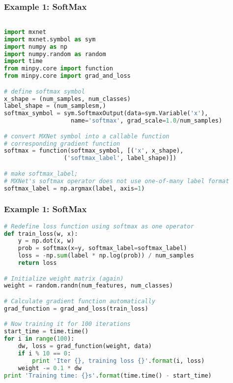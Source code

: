 \begin{frame}[fragile]
  \MyLogo
  \frametitle{Example 1: SoftMax}  

\scriptsize{
\begin{lstlisting}[language=python]

import mxnet
import mxnet.symbol as sym
import numpy as np
import numpy.random as random
import time
from minpy.core import function
from minpy.core import grad_and_loss

# define softmax symbol
x_shape = (num_samples, num_classes)
label_shape = (num_samplesm,)
softmax_symbol = sym.SoftmaxOutput(data=sym.Variable('x'), 
                   name='softmax', grad_scale=1.0/num_samples)

# convert MXNet symbol into a callable function 
# corresponding gradient function
softmax = function(softmax_symbol, [('x', x_shape), 
                 ('softmax_label', label_shape)])

# make softmax_label; 
# MXNet's softmax operator does not use one-of-many label format
softmax_label = np.argmax(label, axis=1)
\end{lstlisting}
}
\end{frame}

\begin{frame}[fragile]
  \MyLogo
  \frametitle{Example 1: SoftMax}  

\scriptsize{
\begin{lstlisting}[language=python]
# Redefine loss function using softmax as one operator
def train_loss(w, x):
    y = np.dot(x, w)
    prob = softmax(x=y, softmax_label=softmax_label)
    loss = -np.sum(label * np.log(prob)) / num_samples
    return loss

# Initialize weight matrix (again)
weight = random.randn(num_features, num_classes)

# Calculate gradient function automatically
grad_function = grad_and_loss(train_loss)

# Now training it for 100 iterations
start_time = time.time()
for i in range(100):
    dw, loss = grad_function(weight, data)
    if i % 10 == 0:
        print 'Iter {}, training loss {}'.format(i, loss)
    weight -= 0.1 * dw
print 'Training time: {}s'.format(time.time() - start_time)
\end{lstlisting}
}
\end{frame}